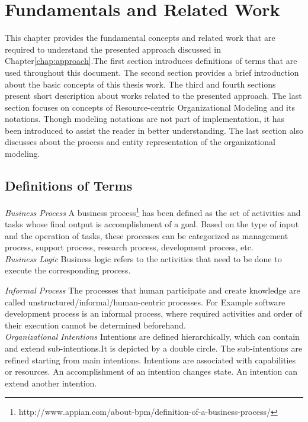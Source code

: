 \chapter{Fundamentals and Related Work}
\label{chap:fundamentals}
This chapter provides the fundamental concepts and related work that are required to understand the presented approach discussed in Chapter\ref{chap:approach}.The first section introduces definitions of terms that are used throughout this document. The second section provides a brief introduction about the basic concepts of this thesis work.  The third and fourth sections present short description about  works related to the presented approach. The last section focuses on concepts of Resource-centric Organizational Modeling and its notations. Though modeling notations are not part of implementation, it has been introduced to assist the reader in better understanding. The last section also discusses about the process and entity representation of the organizational modeling.  



\section{Definitions of Terms}
\label{sec:termdefinitions}
\textit{Business Process} A business process\footnote{http://www.appian.com/about-bpm/definition-of-a-business-process/} has been defined as the set of activities and tasks whose final output is accomplishment of a goal. Based on the type of input and the operation of tasks, these processes can be categorized as management process, support process, research process, development process, etc.      \\

\textit{Business Logic} Business logic refers to the activities that need to be done to execute the corresponding process.

\textit{Informal Process}  The processes that human participate and create knowledge are called unstructured/informal/human-centric processes. For Example software development process is an informal process, where required activities and order of their execution cannot be determined beforehand.       \\

\textit{Organizational Intentions} Intentions are defined hierarchically, which can contain and extend sub-intentions.It is depicted by a double circle. The sub-intentions are refined starting from main intentions. Intentions are associated with capabilities or resources. An accomplishment of an intention changes state. An intention can extend another intention.        \\

